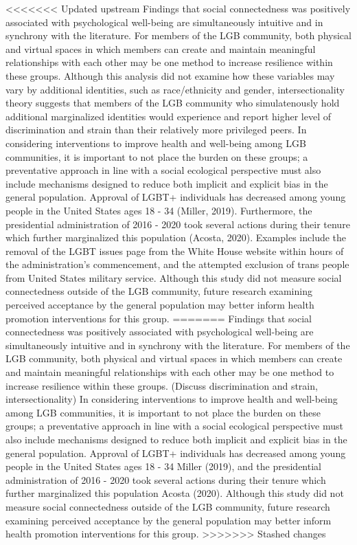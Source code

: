 \documentclass[
  english,
  man,floatsintext]{apa6}
\begin{document}
<<<<<<< Updated upstream
Findings that social connectedness was positively associated with psychological well-being are simultaneously intuitive and in synchrony with the literature. For members of the LGB community, both physical and virtual spaces in which members can create and maintain meaningful relationships with each other may be one method to increase resilience within these groups. Although this analysis did not examine how these variables may vary by additional identities, such as race/ethnicity and gender, intersectionality theory suggests that members of the LGB community who simulatenously hold additional marginalized identities would experience and report higher level of discrimination and strain than their relatively more privileged peers.
In considering interventions to improve health and well-being among LGB communities, it is important to not place the burden on these groups; a preventative approach in line with a social ecological perspective must also include mechanisms designed to reduce both implicit and explicit bias in the general population. Approval of LGBT+ individuals has decreased among young people in the United States ages 18 - 34 (Miller, 2019). Furthermore, the presidential administration of 2016 - 2020 took several actions during their tenure which further marginalized this population (Acosta, 2020). Examples include the removal of the LGBT issues page from the White House website within hours of the administration's commencement, and the attempted exclusion of trans people from United States military service. Although this study did not measure social connectedness outside of the LGB community, future research examining perceived acceptance by the general population may better inform health promotion interventions for this group.
=======
Findings that social connectedness was positively associated with psychological well-being are simultaneously intuitive and in synchrony with the literature. For members of the LGB community, both physical and virtual spaces in which members can create and maintain meaningful relationships with each other may be one method to increase resilience within these groups.
(Discuss discrimination and strain, intersectionality)
In considering interventions to improve health and well-being among LGB communities, it is important to not place the burden on these groups; a preventative approach in line with a social ecological perspective must also include mechanisms designed to reduce both implicit and explicit bias in the general population. Approval of LGBT+ individuals has decreased among young people in the United States ages 18 - 34 Miller (2019), and the presidential administration of 2016 - 2020 took several actions during their tenure which further marginalized this population Acosta (2020). Although this study did not measure social connectedness outside of the LGB community, future research examining perceived acceptance by the general population may better inform health promotion interventions for this group.
>>>>>>> Stashed changes
\end{document}

